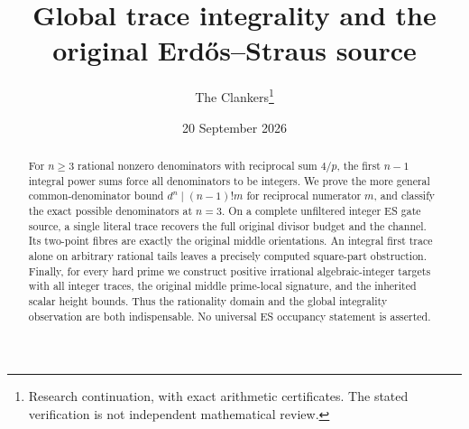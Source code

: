 \documentclass[11pt]{article}
\title{Global trace integrality and the original Erd\H{o}s--Straus source}
\author{The Clankers\thanks{Research continuation, with exact arithmetic certificates.
The stated verification is not independent mathematical review.}}
\date{20 September 2026}
\begin{document}
\maketitle
\begin{abstract}
For $n\ge3$ rational nonzero denominators with reciprocal sum $4/p$, the first
$n-1$ integral power sums force all denominators to be integers. We prove the
more general common-denominator bound $d^n\mid(n-1)!m$ for reciprocal numerator
$m$, and classify the exact possible denominators at $n=3$. On a complete
unfiltered integer ES gate source, a single literal trace recovers the full
original divisor budget and the channel. Its two-point fibres are exactly the
original middle orientations. An integral first trace alone on arbitrary
rational tails leaves a precisely computed square-part obstruction. Finally,
for every hard prime we construct positive irrational algebraic-integer targets
with all integer traces, the original middle prime-local signature, and the
inherited scalar height bounds. Thus the rationality domain and the global
integrality observation are both indispensable. No universal ES occupancy
statement is asserted.
\end{abstract}


\end{document}
